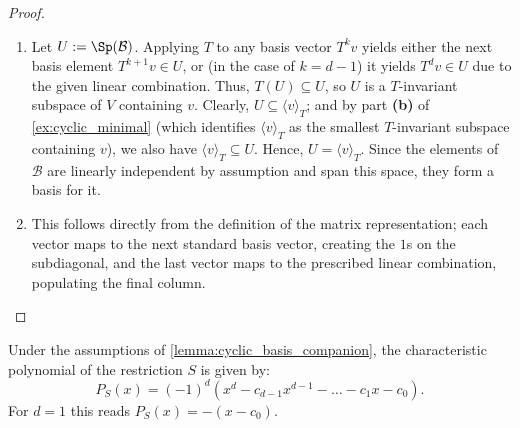 \begin{proof}
  \begin{enumerate}[label=\textbf{(\alph*)}]
    \item Let $U := \Sp(\mathcal{B})$. Applying $T$ to any basis vector $T^k v$ yields either the next basis element $T^{k+1}v \in U$, or (in the case of $k=d-1$) it yields $T^d v \in U$ due to the given linear combination. Thus, $T(U) \subseteq U$, so $U$ is a $T$-invariant subspace of $V$ containing $v$. Clearly, $U \subseteq \langle v \rangle_T$; and by part \textbf{(b)} of \cref{ex:cyclic_minimal} (which identifies $\langle v \rangle_T$ as the smallest $T$-invariant subspace containing $v$), we also have $\langle v \rangle_T \subseteq U$. Hence, $U = \langle v \rangle_T$. Since the elements of $\mathcal{B}$ are linearly independent by assumption and span this space, they form a basis for it.
    \item This follows directly from the definition of the matrix representation; each vector maps to the next standard basis vector, creating the $1$s on the subdiagonal, and the last vector maps to the prescribed linear combination, populating the final column.
  \end{enumerate}
\end{proof}

\begin{lemma}
  \label{lemma:companion_char_poly}
  Under the assumptions of \cref{lemma:cyclic_basis_companion}, the characteristic polynomial of the restriction $S$ is given by:
  \[
  P_S(x) = (-1)^d (x^d - c_{d-1}x^{d-1} - \dots - c_1 x - c_0).
  \]
  For $d = 1$ this reads $P_S(x) = -(x - c_0)$.
\end{lemma}

